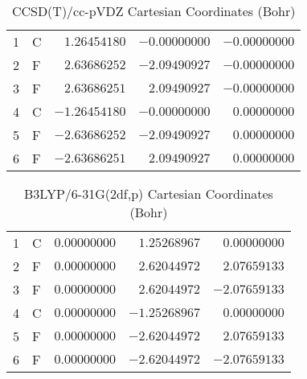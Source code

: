 \documentclass[10pt,oneside]{article}
\begin{document}
\begin{table}[h!]
\centering
\caption{CCSD(T)/cc-pVDZ Cartesian Coordinates (Bohr)}
\begin{tabular}{llrrr}
1  & C  & $ 1.26454180$ & $-0.00000000$ & $-0.00000000$ \\
2  & F  & $ 2.63686252$ & $-2.09490927$ & $-0.00000000$ \\
3  & F  & $ 2.63686251$ & $ 2.09490927$ & $-0.00000000$ \\
4  & C  & $-1.26454180$ & $-0.00000000$ & $ 0.00000000$ \\
5  & F  & $-2.63686252$ & $-2.09490927$ & $ 0.00000000$ \\
6  & F  & $-2.63686251$ & $ 2.09490927$ & $ 0.00000000$ \\
\end{tabular}
\end{table}

\begin{table}[h!]
\centering
\caption{B3LYP/6-31G(2df,p) Cartesian Coordinates (Bohr)}
\begin{tabular}{llrrr}
1  & C  & $ 0.00000000$ & $ 1.25268967$ & $ 0.00000000$ \\
2  & F  & $ 0.00000000$ & $ 2.62044972$ & $ 2.07659133$ \\
3  & F  & $ 0.00000000$ & $ 2.62044972$ & $-2.07659133$ \\
4  & C  & $ 0.00000000$ & $-1.25268967$ & $ 0.00000000$ \\
5  & F  & $ 0.00000000$ & $-2.62044972$ & $ 2.07659133$ \\
6  & F  & $ 0.00000000$ & $-2.62044972$ & $-2.07659133$ \\
\end{tabular}
\end{table}

\clearpage
\end{document}
